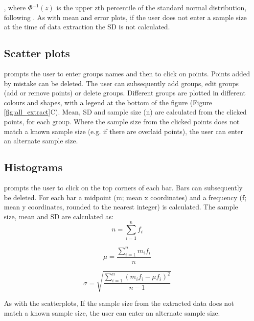 \documentclass[article]{jss}
\newcommand{\fct}[1]{\code{#1()}}
\begin{document}
, where $\Phi^{-1}(z)$ is the upper zth percentile of the standard normal distribution, following \citet{Wan2014}. As with mean and error plots, if the user does not enter a sample size at the time of data extraction the SD is not calculated.

\subsection{Scatter plots}
\fct{metaDigitise} prompts the user to enter groups names and then to click on points. Points added by mistake can be deleted. The user can subsequently add groups, edit groups (add or remove points) or delete groups. Different groups are plotted in different colours and shapes, with a legend at the bottom of the figure (Figure \ref{fig:all_extract}C). Mean, SD and sample size (n) are calculated from the clicked points, for each group. Where the sample size from the clicked points does not match a known sample size (e.g. if there are overlaid points), the user can enter an alternate sample size.

\subsection{Histograms}
\fct{metaDigitise} prompts the user to click on the top corners of each bar. Bars can subsequently be deleted. 
For each bar a midpoint (m; mean x coordinates) and a frequency (f; mean y coordinates, rounded to the nearest integer) is calculated. The sample size, mean and SD are calculated as:
\begin{equation}
n = \sum_{i=1}^n{f_i}
\end{equation}

\begin{equation}
\mu = \frac{\sum_{i=1}^n{m_i f_i}}{n}
\end{equation}

\begin{equation}
\sigma = \sqrt{\frac{\sum_{i=1}^n{(m_i f_i - \mu f_i)^2}}{n-1}}
\end{equation}

As with the scatterplots, If the sample size from the extracted data does not match a known sample size, the user can enter an alternate sample size.
\end{document}
